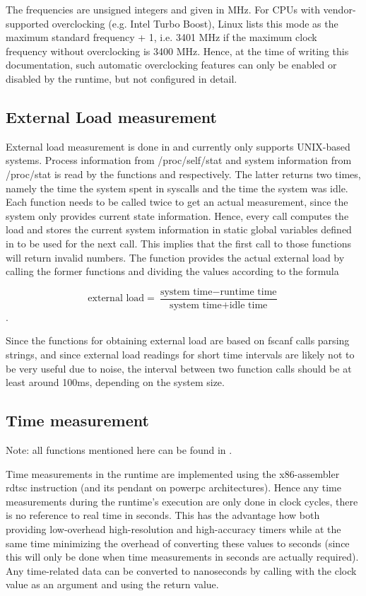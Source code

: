 The frequencies are unsigned integers and given in MHz. For CPUs with vendor-supported overclocking (e.g. Intel Turbo Boost), Linux lists this mode as the maximum standard frequency + 1, i.e. 3401 MHz if the maximum clock frequency without overclocking is 3400 MHz. Hence, at the time of writing this documentation, such automatic overclocking features can only be enabled or disabled by the runtime, but not configured in detail.

\subsection{External Load measurement}

External load measurement is done in  and currently only supports UNIX-based systems. Process information from
/proc/self/stat and system information from /proc/stat is read by the functions
 and  respectively.
The latter returns two times, namely the time the system spent in syscalls and
the time the system was idle. Each function needs to be called twice to get an
actual measurement, since the system only provides current state information.
Hence, every call computes the load and stores the current system information
in static global variables defined in  to be used for the next
call. This implies that the first call to those functions will return invalid
numbers. The function  provides the actual
external load by calling the former functions and dividing the values according
to the formula

\[ \text{external load} = \frac{\text{system time} - \text{runtime
time}}{\text{system time} + \text{idle time}} \].

Since the functions for obtaining external load are based on fscanf calls
parsing strings, and since external load readings for short time intervals are
likely not to be very useful due to noise, the interval between two
 function calls should be at least around
100ms, depending on the system size.

\subsection{Time measurement} 
\label{sec:runtime.abstraction.time.measurement}

Note: all functions mentioned here can be found in .


Time measurements in the runtime are implemented using the x86-assembler rdtsc
instruction (and its pendant on powerpc architectures). Hence any time
measurements during the runtime's execution are only done in clock cycles, there
is no reference to real time in seconds. This has the advantage how both
providing low-overhead high-resolution and high-accuracy timers while at the
same time minimizing the overhead of converting these values to seconds (since
this will only be done when time measurements in seconds are actually required).
Any time-related data can be converted to nanoseconds by calling
 with the clock value as an
argument and using the return value.

